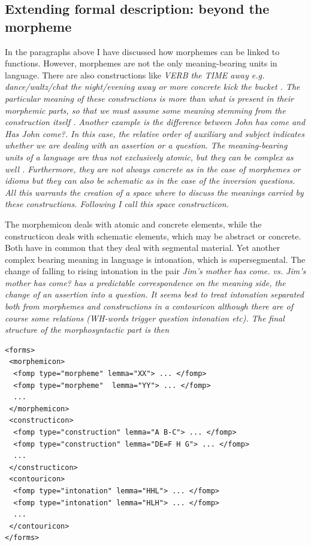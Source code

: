 \documentclass[a4paper,12pt]{article}
\begin{document}
\subsection{Extending formal description: beyond the morpheme}
In the paragraphs above I have discussed how morphemes can be linked to functions. However, morphemes are not the only meaning-bearing units in language. There are also constructions like \em VERB the TIME away \em e.g. \em dance/waltz/chat the night/evening away \em or more concrete \em kick the bucket \em \citep{CulicoverEtAl2005}. The particular meaning of these constructions is more than what is present in their morphemic parts, so that we must assume some meaning stemming from the construction itself \citep{FillmoreEtAl1993CxG,Goldberg1995CxG,Croft2001rcg}. Another example is the difference between \em John has come \em and \em Has John come?\em. In this case, the relative order of auxiliary and subject indicates whether we are dealing with an assertion or a question. The meaning-bearing units of a language are thus not exclusively atomic, but they can be complex as well \citep{Lehmann1993}. Furthermore, they are not always concrete as in the case of morphemes or idioms but they can also be schematic as in the case of the inversion questions. All this warrants the creation of a space where to discuss the meanings carried by these constructions. Following \citet{Goldberg1995CxG} I call this space \em constructicon\em.

The morphemicon deals with atomic and concrete elements, while the constructicon deals with schematic elements, which may be abstract or concrete. Both have in common that they deal with segmental material. Yet another complex bearing meaning in language is intonation, which is supersegmental. The change of falling to rising intonation in the pair \em Jim's mother has come. \em vs. \em Jim's mother has come? \em has a predictable 	correspondence on the meaning side, the change of an assertion into a question. It seems best to treat intonation separated both from morphemes and constructions in a \em contouricon \em although there are of course some relations (WH-words trigger question intonation etc). The final structure of the morphosyntactic part is then

\ea\label{xml:semasiology}
\begin{verbatim} 
<forms>
 <morphemicon>
  <fomp type="morpheme" lemma="XX"> ... </fomp>
  <fomp type="morpheme"  lemma="YY"> ... </fomp>
  ...
 </morphemicon>
 <constructicon>
  <fomp type="construction" lemma="A B-C"> ... </fomp>
  <fomp type="construction" lemma="DE=F H G"> ... </fomp>
  ...
 </constructicon>
 <contouricon>
  <fomp type="intonation" lemma="HHL"> ... </fomp>
  <fomp type="intonation" lemma="HLH"> ... </fomp>
  ...
 </contouricon>
</forms>
\end{verbatim} 
\z
\end{document}
